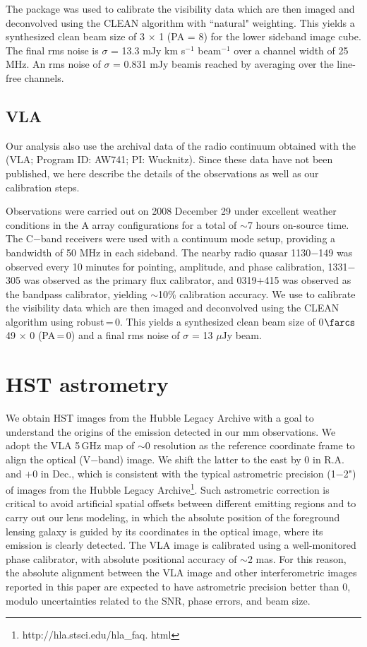 \documentclass[]{emulateapj}
\begin{document}
The  package was used to calibrate the visibility data which are
then imaged and deconvolved using the CLEAN algorithm with ``natural" weighting. This yields a synthesized clean
beam size of 3 $\times$ 1 (PA = 8\degr) for the lower sideband
image cube. The final rms noise is $\sigma$ = 13.3 mJy km s$^{-1}$ beam$^{-1}$
over a channel width of 25 MHz. An rms noise of
$\sigma$ = 0.831 mJy beam\pmOne is reached by averaging over the
line-free channels.


\subsection{VLA} %
Our analysis also use the archival data of the radio continuum obtained with the \vla (VLA; Program ID: AW741; PI: Wucknitz). Since these data have not been
published, we here describe the details of the observations as well as our calibration steps.

Observations were carried out on 2008 December 29 under excellent weather
conditions in the A array configurations for a total of $\sim$7 hours on-source time. The C$-$band receivers were used with a continuum mode setup,
providing a bandwidth of 50 MHz in each sideband.
The nearby radio quasar 1130$-$149 was observed every 10 minutes for
pointing, amplitude, and phase calibration, 1331$-$305 was observed as the
primary flux calibrator, and 0319$+$415 was observed as the bandpass
calibrator, yielding $\sim$10\% calibration accuracy.
We use \aips to calibrate the visibility data which
are then imaged and deconvolved using
the CLEAN algorithm using robust\,=\,0. This yields a synthesized clean
beam size of 0$\farcs$49 $\times$ 0 (PA\,=\,0) and a final
rms noise of $\sigma$ = 13 $\mu$Jy beam\pmOne.


\section{HST astrometry} %
We obtain HST images from the Hubble Legacy Archive with
a goal to understand the origins of the emission detected
in our mm observations. We adopt the VLA 5\,GHz map of $\sim$0
resolution as the reference coordinate frame to align the optical (V$-$band) image.
We shift the latter to the east by 0 in R.A. and $+$0 in
Dec., which is consistent with the typical astrometric precision (1$-$2") of
images from the Hubble Legacy Archive\footnote{http://hla.stsci.edu/hla\_faq.
html}. Such astrometric correction is critical to avoid artificial spatial
offsets between different emitting regions and to carry out our lens modeling,
in which the absolute position of the foreground lensing galaxy is guided by its
coordinates in the optical image, where its emission is clearly detected.
The VLA image is calibrated using a well-monitored phase
calibrator, with absolute positional accuracy of $\sim$2 mas.
For this reason, the absolute alignment between the VLA image and other
interferometric images reported in this paper are expected to have astrometric
precision better than 0, modulo uncertainties related to the SNR, phase
errors, and beam size.
\end{document}
